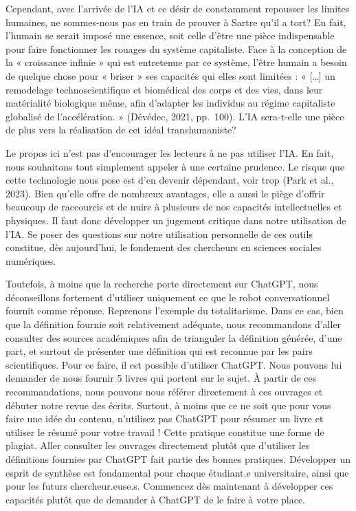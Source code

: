\documentclass[
  letterpaper,
  DIV=11,
  numbers=noendperiod]{scrreprt}
\begin{document}
Cependant, avec l'arrivée de l'IA et ce désir de constamment repousser
les limites humaines, ne sommes-nous pas en train de prouver à Sartre
qu'il a tort? En fait, l'humain se serait imposé une essence, soit celle
d'être une pièce indispensable pour faire fonctionner les rouages du
système capitaliste. Face à la conception de la « croissance infinie »
qui est entretenue par ce système, l'être humain a besoin de quelque
chose pour « briser » ses capacités qui elles sont limitées : «
{[}\ldots{]} un remodelage technoscientifique et biomédical des corps et
des vies, dans leur matérialité biologique même, afin d'adapter les
individus au régime capitaliste globalisé de l'accélération. » (Dévédec,
2021, pp.~100). L'IA sera-t-elle une pièce de plus vers la réalisation
de cet idéal transhumaniste?

Le propos ici n'est pas d'encourager les lecteurs à ne pas utiliser
l'IA. En fait, nous souhaitons tout simplement appeler à une certaine
prudence. Le risque que cette technologie nous pose est d'en devenir
dépendant, voir trop (Park et al., 2023). Bien qu'elle offre de nombreux
avantages, elle a aussi le piège d'offrir beaucoup de raccourcis et de
nuire à plusieurs de nos capacités intellectuelles et physiques. Il faut
donc développer un jugement critique dans notre utilisation de l'IA. Se
poser des questions sur notre utilisation personnelle de ces outils
constitue, dès aujourd'hui, le fondement des chercheurs en sciences
sociales numériques.

Toutefois, à moins que la recherche porte directement sur ChatGPT, nous
déconseillons fortement d'utiliser uniquement ce que le robot
conversationnel fournit comme réponse. Reprenons l'exemple du
totalitarisme. Dans ce cas, bien que la définition fournie soit
relativement adéquate, nous recommandons d'aller consulter des sources
académiques afin de trianguler la définition générée, d'une part, et
surtout de présenter une définition qui est reconnue par les pairs
scientifiques. Pour ce faire, il est possible d'utiliser ChatGPT. Nous
pouvons lui demander de nous fournir 5 livres qui portent sur le sujet.
À partir de ces recommandations, nous pouvons nous référer directement à
ces ouvrages et débuter notre revue des écrits. Surtout, à moins que ce
ne soit que pour vous faire une idée du contenu, n'utilisez pas ChatGPT
pour résumer un livre et utiliser le résumé pour votre travail ! Cette
pratique constitue une forme de plagiat. Aller consulter les ouvrages
directement plutôt que d'utiliser les définitions fournies par ChatGPT
fait partie des bonnes pratiques. Développer un esprit de synthèse est
fondamental pour chaque étudiant.e universitaire, ainsi que pour les
futurs chercheur.euse.s. Commencez dès maintenant à développer ces
capacités plutôt que de demander à ChatGPT de le faire à votre place.
\end{document}
